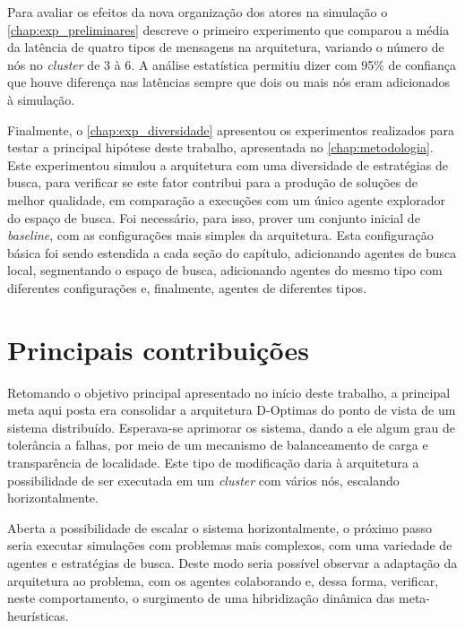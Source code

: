 Para avaliar os efeitos da nova organização dos atores na simulação o \autoref{chap:exp_preliminares} descreve o primeiro experimento  que comparou a média da latência de quatro tipos de mensagens na arquitetura, variando o número de nós no \textit{cluster}  de 3 à 6. A análise estatística permitiu dizer com 95\% de confiança que houve diferença nas latências sempre que dois ou mais nós eram adicionados à simulação. 

Finalmente, o \autoref{chap:exp_diversidade} apresentou os experimentos realizados para testar a principal hipótese deste trabalho, apresentada no \autoref{chap:metodologia}. Este experimentou simulou a arquitetura com uma diversidade de estratégias de busca, para verificar se este fator contribui para a produção de soluções de melhor qualidade, em comparação a execuções com um único agente explorador do espaço de busca. Foi necessário, para isso, prover um conjunto inicial de \textit{baseline}, com as configurações mais simples da arquitetura. Esta configuração básica foi sendo estendida a cada seção do capítulo, adicionando agentes de busca local, segmentando o espaço de busca, adicionando agentes do mesmo tipo com diferentes configurações e, finalmente, agentes de diferentes tipos.   

\section{Principais contribuições}

Retomando o objetivo principal apresentado no início deste trabalho, a principal meta aqui posta era consolidar a arquitetura D-Optimas do ponto de vista de um sistema distribuído. Esperava-se aprimorar os sistema, dando a ele algum grau de tolerância a falhas, por meio de um mecanismo de balanceamento de carga e transparência de localidade. Este tipo de modificação daria à arquitetura a possibilidade de ser executada em um \textit{cluster} com vários nós, escalando horizontalmente. 

Aberta a possibilidade de escalar o sistema horizontalmente, o próximo passo seria executar simulações com problemas mais complexos, com uma variedade de agentes e estratégias de busca. Deste modo seria possível observar a adaptação da arquitetura ao problema, com os agentes colaborando e, dessa forma, verificar, neste comportamento,  o surgimento de uma hibridização dinâmica das meta-heurísticas.

